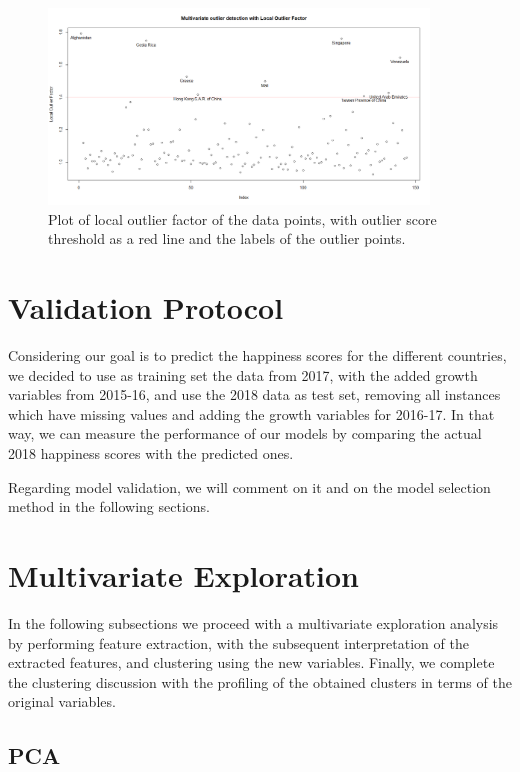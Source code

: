 \documentclass[12pt]{extarticle}
\begin{document}
\begin{figure}[H]
  \centering
    \includegraphics[width=0.90\textwidth]{figures/lof.png}
    \caption{Plot of local outlier factor of the data points, with outlier score threshold as a red line and the labels of the outlier points.\label{fig:lof}}
\end{figure}

\section{Validation Protocol}

Considering our goal is to predict the happiness scores for the different countries, we decided to use as training set the data from 2017, with the added growth variables from 2015-16, and use the 2018 data as test set, removing all instances which have missing values and adding the growth variables for 2016-17. In that way, we can measure the performance of our models by comparing the actual 2018 happiness scores with the predicted ones.

Regarding model validation, we will comment on it and on the model selection method in the following sections.

\newpage
\section{Multivariate Exploration}

In the following subsections we proceed with a multivariate exploration analysis by performing feature extraction, with the subsequent interpretation of the extracted features, and clustering using the new variables. Finally, we complete the clustering discussion with the profiling of the obtained clusters in terms of the original variables.

\subsection{PCA}
\end{document}
